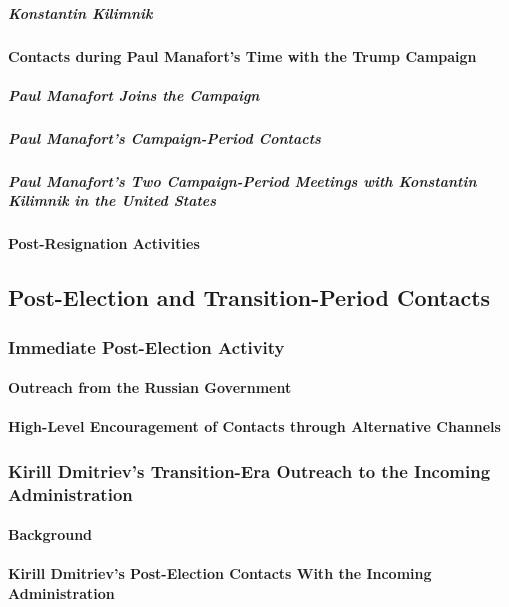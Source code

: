 \subparagraph{Konstantin Kilimnik}

\paragraph{Contacts during Paul Manafort's Time with the Trump Campaign}

\subparagraph{Paul Manafort Joins the Campaign}

\subparagraph{Paul Manafort's Campaign-Period Contacts}

\subparagraph{Paul Manafort's Two Campaign-Period Meetings with Konstantin Kilimnik in the United States}

\paragraph{Post-Resignation Activities}

\subsection{Post-Election and Transition-Period Contacts}

\subsubsection{Immediate Post-Election Activity}

\paragraph{Outreach from the Russian Government}

\paragraph{High-Level Encouragement of Contacts through Alternative Channels}

\subsubsection{Kirill Dmitriev's Transition-Era Outreach to the Incoming Administration}

\paragraph{Background}

\paragraph{Kirill Dmitriev's Post-Election Contacts With the Incoming Administration}

